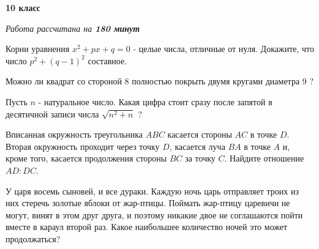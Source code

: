 \centerline{\bf \huge 10 класс}
\centerline{\normalsize{\it Работа рассчитана на \bf{180} минут}}

Корни уравнения $x^2+p x+q=0$ - целые числа, отличные от нуля. Докажите, что число $p^2+(q-1)^2$ составное.

Можно ли квадрат со стороной 8 полностью покрыть двумя кругами диаметра 9 ?

Пусть $n$ - натуральное число. Какая цифра стоит сразу после запятой в десятичной записи числа $\sqrt{n^2+n}$ ?

Вписанная окружность треугольника $A B C$ касается стороны $A C$ в точке $D$. Вторая окружность проходит через точку $D$, касается луча $B A$ в точке $A$ и, кроме того, касается продолжения стороны $B C$ за точку $C$. Найдите отношение $A D: D C$.

У царя восемь сыновей, и все дураки. Каждую ночь царь отправляет троих из них стеречь золотые яблоки от жар-птицы. Поймать жар-птицу царевичи не могут, винят в этом друг друга, и поэтому никакие двое не соглашаются пойти вместе в караул второй раз. Какое наибольшее количество ночей это может продолжаться?

